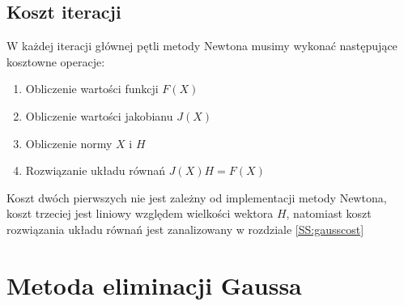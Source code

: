 \documentclass[11pt,wide]{mwart}
\begin{document}
\subsection*{Koszt iteracji}
W każdej iteracji głównej pętli metody Newtona musimy wykonać następujące kosztowne operacje:
\begin{enumerate}
\item Obliczenie wartości funkcji $ F(X) $
\item Obliczenie wartości jakobianu $ J(X) $
\item Obliczenie normy $ X $ i $ H $
\item Rozwiązanie układu równań $ J(X)H = F(X)$
\end{enumerate}
Koszt dwóch pierwszych nie jest zależny od implementacji metody Newtona, koszt trzeciej jest liniowy względem wielkości wektora $ H $, natomiast koszt rozwiązania układu równań jest zanalizowany w rozdziale \ref{SS:gausscost}
\section{Metoda eliminacji Gaussa}
\end{document}
